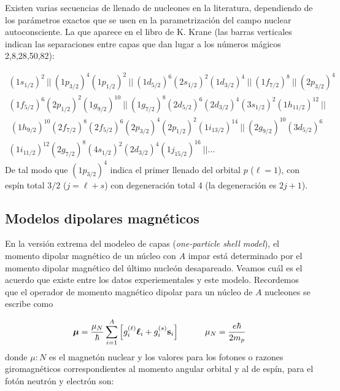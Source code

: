 Existen varias secuencias de llenado de nucleones en la literatura, dependiendo de los parámetros exactos que se usen en la parametrización del campo nuclear autoconsciente. La que aparece en el libro de K. Krane (las barras verticales indican las separaciones entre capas que dan lugar a los números mágicos 2,8,28,50,82):

\begin{equation}
	\begin{array}{l}(1s_{1/2})^2 \ || \ (1p_{3/2})^4 (1p_{1/2})^2 \ || \ (1d_{5/2})^6 (2s_{1/2})^2 (1d_{3/2})^4 \ || \ (1f_{7/2})^8 \ || \ (2p_{3/2})^4 \\ (1f_{5/2})^6 (2p_{1/2})^2 (1g_{9/2})^{10} \ || \ (1g_{7/2})^8 (2d_{5/2})^6 (2d_{3/2})^4 (3s_{1/2})^2 (1h_{11/2})^{12}    \ || \\ \ (1h_{9/2})^{10} (2f_{7/2})^8 (2f_{5/2})^6 (2p_{3/2})^4 (2p_{1/2})^2  (1i_{13/2})^{14} \ || \ (2g_{9/2})^{10} (3d_{5/2})^6 \\ (1i_{11/2})^{12}    (2g_{7/2})^8 (4s_{1/2})^2 (2d_{3/2})^4  (1j_{15/2})^{16} \ ||		\ldots
	\end{array}
\end{equation}
De tal modo que $(1p_{3/2})^4$ indica el primer llenado del orbital $p$ ($\ell=1$), con espín total $3/2$ ($j=\ell + s$) con degeneración total 4 (la degeneración es $2j+1$). 



\subsection{Modelos dipolares magnéticos}

En la versión extrema del modeleo de capas (\textit{one-particle shell model}), el momento dipolar magnético de un núcleo con $A$ impar está determinado por el momento dipolar magnético del último nucleón desapareado. Veamos cuál es el acuerdo que existe entre los datos experiementales y este modelo. Recordemos que el operador de momento magnético dipolar para un núcleo de $A$ nucleones se escribe como

\begin{equation}
	\boldsymbol{\mu} = \frac{\mu_N}{\hbar} \sum_{i=1}^A \left[ g_i^{(\ell)} \boldsymbol{\ell}_i + g_i^{(s)}\mathbf{s}_i \right] \quad \quad \quad \mu_N = \frac{e\hbar}{2m_p}
\end{equation}
donde $\mu:N$ es el magnetón nuclear y los valores para los fotones o razones giromagnéticos correspondientes al momento angular orbital y al de espín, para el fotón neutrón y electrón son:

